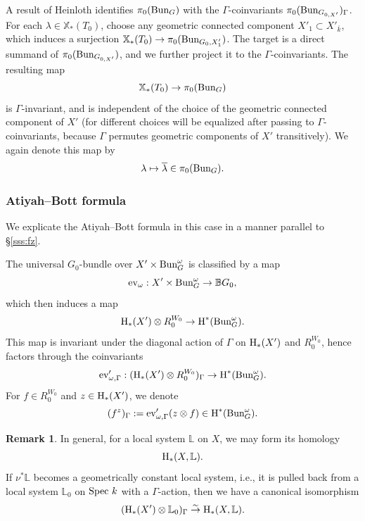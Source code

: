 \documentclass[reqno]{amsart}
\numberwithin{equation}{subsection}
\theoremstyle{definition}
\newtheorem{remark}[subsubsection]{Remark}
\def\BB{\mathbb{B}}
\def\LL{\mathbb{L}}
\newcommand{\Bun}{\textup{Bun}}
\newcommand\ev{\textup{ev}}
\newcommand\Spec{\textup{Spec}\ }
\newcommand\xcoch{\mathbb{X}_*}
\newcommand{\ov}{\overline}
\newcommand\ot{\otimes}
\newcommand{\homog}[2]{\textup{H}_{#1}({#2})}  %
\newcommand{\cohog}[2]{\textup{H}^{#1}({#2})}     %
\newcommand\mt{\mapsto}
\newcommand{\isom}{\stackrel{\sim}{\to}}
\newcommand\G\Gamma
\renewcommand{\l}{\lambda}
\newcommand{\om}{\omega}
\newcommand{\ol}[1]{\overline{#1}}
\begin{document}
A result of Heinloth \cite[Theorem 2]{Hei10} identifies $\pi_{0}(\Bun_{G})$ with the $\G$-coinvariants $\pi_{0}(\Bun_{G_{0, X'}})_{\G}$. For each $\l\in \xcoch(T_{0})$, choose any geometric connected component $X'_{1}\subset X'_{\ol k}$, which induces a surjection $\xcoch(T_{0})\to \pi_{0}(\Bun_{G_{0}, X'_{1}})$. The target is a direct summand of $\pi_{0}(\Bun_{G_{0, X'}})$, and we further project it to the $\G$-coinvariants. The resulting map 
\begin{equation*}
\xcoch(T_{0})\to \pi_{0}(\Bun_{G})
\end{equation*}
is $\G$-invariant,  and is independent of the choice of the geometric connected component of $X'$ (for different choices will be equalized after passing to $\G$-coinvariants, because $\G$ permutes geometric components of $X'$ transitively). We again denote this map by 
\begin{equation*}
\l\mt \ov \l\in \pi_{0}(\Bun_{G}).
\end{equation*}




\subsubsection{Atiyah--Bott formula}\label{sssec:non-split-AB-formula}
We explicate the Atiyah--Bott formula in this case in a manner parallel to \S \ref{sss:fz}.

The universal $G_{0}$-bundle over $X'\times \Bun^{\om}_{G}$ is classified by a map
\begin{equation*}
\ev_{\om}: X'\times \Bun_{G}^{\om} \to \BB G_{0},
\end{equation*}
which then induces a map
\begin{equation*}
\homog{*}{X'}\ot R_{0}^{W_{0}}\to \cohog{*}{\Bun_{G}^{\om}}.
\end{equation*}
This map is invariant under the diagonal action of $\G$ on $\homog{*}{X'}$ and $R_{0}^{W_{0}}$, hence factors through the coinvariants
\begin{equation}\label{ev' nonsplit}
\ev'_{\om, \G}:(\homog{*}{X'}\ot R_{0}^{W_{0}})_{\G}\to \cohog{*}{\Bun_{G}^{\om}}.
\end{equation}
For $f\in R_{0}^{W_{0}}$ and $z\in \homog{*}{X'}$, we denote
\begin{equation*}
(f^{z})_{\G}:=\ev'_{\om, \G}(z\ot f)\in \cohog{*}{\Bun_{G}^{\om}}.
\end{equation*}

\begin{remark}\label{rem:homology-as-coinvariants} In general, for a local system $\LL$ on $X$, we may form its homology
\begin{equation*}
\homog{*}{X,\LL}.
\end{equation*}
If $\nu^{*}\LL$ becomes a geometrically constant local system, i.e., it is pulled back from a local system $\LL_{0}$ on $\Spec k$ with a $\G$-action, then we have a canonical isomorphism
\begin{equation*}
(\homog{*}{X'}\ot \LL_{0})_{\G}\isom \homog{*}{X,\LL}.
\end{equation*}
\end{remark}
\end{document}
